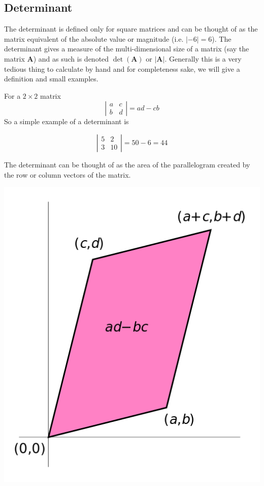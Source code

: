 \documentclass[]{book}
\theoremstyle{definition}
\theoremstyle{definition}
\theoremstyle{remark}
\begin{document}
\subsection{Determinant}\label{determinant}

The determinant is defined only for square matrices and can be thought
of as the matrix equivalent of the absolute value or magnitude (i.e.
\(|-6|=6\)). The determinant gives a measure of the multi-dimensional
size of a matrix (say the matrix \(\boldsymbol{A}\)) and as such is
denoted \(\det\left(\boldsymbol{A}\right)\) or
\(\left|\boldsymbol{A}\right|\). Generally this is a very tedious thing
to calculate by hand and for completeness sake, we will give a
definition and small examples.

For a \(2\times2\) matrix \[
\left|\begin{array}{cc}
a & c\\
b & d
\end{array}\right|=ad-cb
\] So a simple example of a determinant is

\[
\left|\begin{array}{cc}
5 & 2\\
3 & 10
\end{array}\right|=50-6=44
\]

The determinant can be thought of as the area of the parallelogram
created by the row or column vectors of the matrix.

\begin{center}\includegraphics[width=6.94in]{External_Images/determinant} \end{center}
\end{document}
